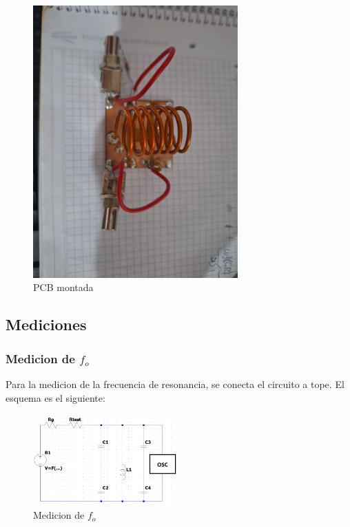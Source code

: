 \begin{figure}[h]
    \centering
    \includegraphics[width=0.7\textwidth]{Imagenes/pcb2.jpeg}
    \caption{PCB montada}
\end{figure}


\subsection{Mediciones}

\subsubsection{Medicion de $f_o$}

Para la medicion de la frecuencia de resonancia, se conecta el circuito a tope. El esquema es el siguiente:

\begin{figure}[h]
    \centering
    \includegraphics[width=0.5\textwidth]{Imagenes/medicion_fo.png}
    \caption{Medicion de $f_o$}
    \label{fig: de la frecuencia de resonancia $f_o$}
\end{figure}


